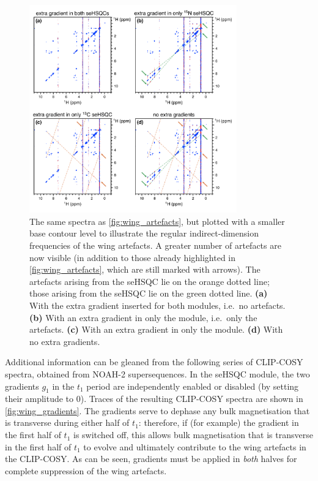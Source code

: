\begin{figure}
    \centering
    \includegraphics[width=0.8\textwidth]{./figures/wing_artefacts2.png}
    \caption{
        The same spectra as \cref{fig:wing_artefacts}, but plotted with a smaller base contour level to illustrate the regular indirect-dimension frequencies of the wing artefacts.
        A greater number of artefacts are now visible (in addition to those already highlighted in \cref{fig:wing_artefacts}, which are still marked with arrows).
        The artefacts arising from the \nitrogen{} seHSQC lie on the orange dotted line; those arising from the \carbon{} seHSQC lie on the green dotted line.
        \textbf{(a)} With the extra gradient inserted for both modules, i.e.\ no artefacts.
        \textbf{(b)} With an extra gradient in only the \nitrogen{} module, i.e.\ only the \carbon{} artefacts.
        \textbf{(c)} With an extra gradient in only the \carbon{} module.
        \textbf{(d)} With no extra gradients.
        \grami{}
    }
    \label{fig:wing_artefacts2}
\end{figure}

\clearpage

Additional information can be gleaned from the following series of CLIP-COSY spectra, obtained from NOAH-2  supersequences.
In the seHSQC module, the two gradients $g_1$ in the $t_1$ period are independently enabled or disabled (by setting their amplitude to 0).
Traces of the resulting CLIP-COSY spectra are shown in \cref{fig:wing_gradients}.
The gradients serve to dephase any bulk  magnetisation that is transverse during either half of $t_1$: therefore, if (for example) the gradient in the first half of $t_1$ is switched off, this allows bulk magnetisation that is transverse in the first half of $t_1$ to evolve and ultimately contribute to the wing artefacts in the CLIP-COSY.
As can be seen, gradients must be applied in \textit{both} halves for complete suppression of the wing artefacts.

